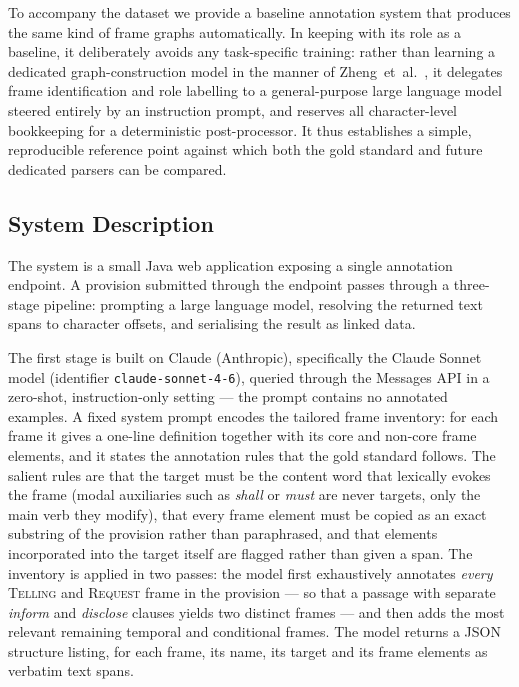 \documentclass[10pt, a4paper, twocolumn]{article}
\begin{document}
To accompany the dataset we provide a baseline annotation system that produces
the same kind of frame graphs automatically. In keeping with its role as a
baseline, it deliberately avoids any task-specific training: rather than learning
a dedicated graph-construction model in the manner of
Zheng~et~al.~\cite{zheng-etal-2022-double}, it delegates frame identification and
role labelling to a general-purpose large language model steered entirely by an
instruction prompt, and reserves all character-level bookkeeping for a
deterministic post-processor. It thus establishes a simple, reproducible
reference point against which both the gold standard and future dedicated parsers
can be compared.

\subsection{System Description}

The system is a small Java web application exposing a single annotation
endpoint. A provision submitted through the endpoint passes through a three-stage
pipeline: prompting a large language model, resolving the returned text spans to
character offsets, and serialising the result as linked data.

The first stage is built on Claude (Anthropic), specifically the Claude Sonnet
model (identifier \texttt{claude-sonnet-4-6}), queried through the Messages API
in a zero-shot, instruction-only setting --- the prompt contains no annotated
examples. A fixed system prompt encodes the tailored frame inventory: for each
frame it gives a one-line definition together with its core and non-core frame
elements, and it states the annotation rules that the gold standard follows. The
salient rules are that the target must be the content word that lexically evokes
the frame (modal auxiliaries such as \textit{shall} or \textit{must} are never
targets, only the main verb they modify), that every frame element must be copied
as an exact substring of the provision rather than paraphrased, and that elements
incorporated into the target itself are flagged rather than given a span. The
inventory is applied in two passes: the model first exhaustively annotates
\emph{every} \textsc{Telling} and \textsc{Request} frame in the provision --- so
that a passage with separate \textit{inform} and \textit{disclose} clauses yields
two distinct frames --- and then adds the most relevant remaining temporal and
conditional frames. The model returns a JSON structure listing, for each frame,
its name, its target and its frame elements as verbatim text spans.
\end{document}
